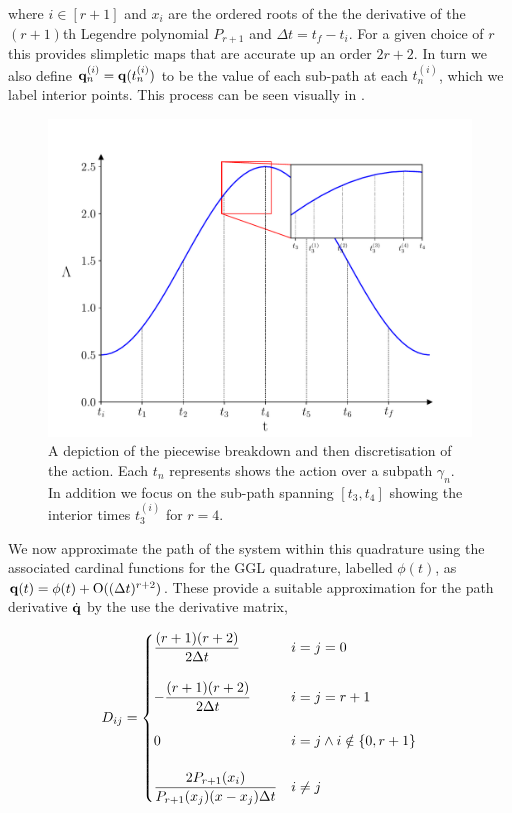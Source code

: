 
where $i \in [r + 1]$ and $x_i$ are the ordered roots of the the derivative of the $(r + 1)$th Legendre polynomial $P_{r + 1}$ and $\Delta t = t_f - t_i$. For a given choice of $r$ this provides slimpletic maps that are accurate up an order $2r + 2$\cite{tsangSLIMPLECTICINTEGRATORSVARIATIONAL2015}. In turn we also define $\vb{q}_n^{(i)} = \vb{q}(t^{(i)}_n)$ to be the value of each sub-path at each $t^{(i)}_n$, which we label interior points. This process can be seen visually in .

\begin{figure}[t]
  \includegraphics[width=\columnwidth]{figures/si-process.pdf}
  \caption{A depiction of the piecewise breakdown and then discretisation of the action. Each $t_n$ represents shows the action over a subpath $\gamma_n$. In addition we focus on the sub-path spanning $[t_3, t_4]$ showing the interior times $t_{3}^{(i)}$ for $r = 4$.}
  \label{fig:si-process}
\end{figure}

We now approximate the path of the system within this quadrature using the associated cardinal functions for the GGL quadrature, labelled $\phi(t)$, as \(\vb q(t) = \phi(t) + \mathord{\mathrm{O}}((\Delta t)^{r + 2})\). These provide a suitable approximation for the path derivative $\dot{\vb q}$ by the use the derivative matrix,

\begin{equation}
\label{eq:dij}
  D_{ij} = \begin{cases}
  	\dfrac{(r + 1)(r + 2)}{2\Delta t} &i = j = 0 \\\\
  	-\dfrac{(r + 1)(r + 2)}{2\Delta t} & i = j = r + 1 \\\\
  	0 & i = j \land i \notin \left\{0, r + 1\right\} \\\\
  	\dfrac{2P_{r + 1}(x_i)}{P_{r+1}(x_j)(x - x_j)\Delta t} & i\neq j
  \end{cases}
\end{equation}

